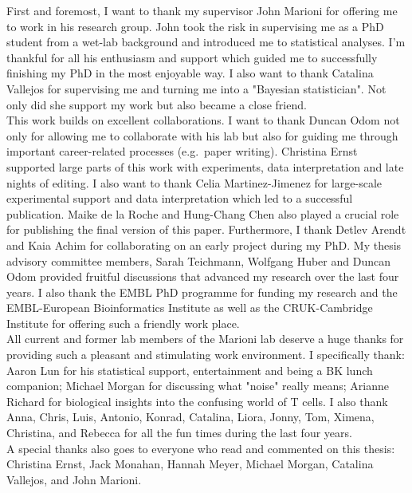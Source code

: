 
\begin{acknowledgements}      

First and foremost, I want to thank my supervisor John Marioni for offering me to work in his research group. John took the risk in supervising me as a PhD student from a wet-lab background and introduced me to statistical analyses. I'm thankful for all his enthusiasm and support which guided me to successfully finishing my PhD in the most enjoyable way. I also want to thank Catalina Vallejos for supervising me and turning me into a "Bayesian statistician". Not only did she support my work but also became a close friend. \\

This work builds on excellent collaborations. I want to thank Duncan Odom not only for allowing me to collaborate with his lab but also for guiding me through important career-related processes (e.g.~paper writing). Christina Ernst supported large parts of this work with experiments, data interpretation and late nights of editing. I also want to thank Celia Martinez-Jimenez for large-scale experimental support and data interpretation which led to a successful publication. Maike de la Roche and Hung-Chang Chen also played a crucial role for publishing the final version of this paper. Furthermore, I thank Detlev Arendt and Kaia Achim for collaborating on an early project during my PhD. My thesis advisory committee members, Sarah Teichmann, Wolfgang Huber and Duncan Odom provided fruitful discussions that advanced my research over the last four years. I also thank the EMBL PhD programme for funding my research and the EMBL-European Bioinformatics Institute as well as the CRUK-Cambridge Institute for offering such a friendly work place.\\

All current and former lab members of the Marioni lab deserve a huge thanks for providing such a pleasant and stimulating work environment. I specifically thank: Aaron Lun for his statistical support, entertainment and being a BK lunch companion; Michael Morgan for discussing what "noise" really means; Arianne Richard for biological insights into the confusing world of T cells. I also thank Anna, Chris, Luis, Antonio, Konrad, Catalina, Liora, Jonny, Tom, Ximena, Christina, and Rebecca for all the fun times during the last four years. \\

A special thanks also goes to everyone who read and commented on this thesis: Christina Ernst, Jack Monahan, Hannah Meyer, Michael Morgan, Catalina Vallejos, and John Marioni. 


\end{acknowledgements}
